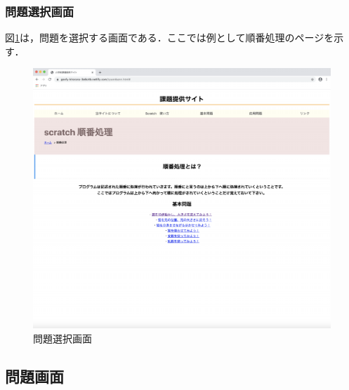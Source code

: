 \newpage

\subsubsection{問題選択画面}
図\ref{fig:mondaisentaku}は，問題を選択する画面である．ここでは例として順番処理のページを示す．

\begin{figure}[h]
\begin{center}
\includegraphics[width=15cm]{zyunnbann.pdf}
\caption{問題選択画面}
\label{fig:mondaisentaku}
\end{center}
\end{figure}

\newpage

\subsection{問題画面}

